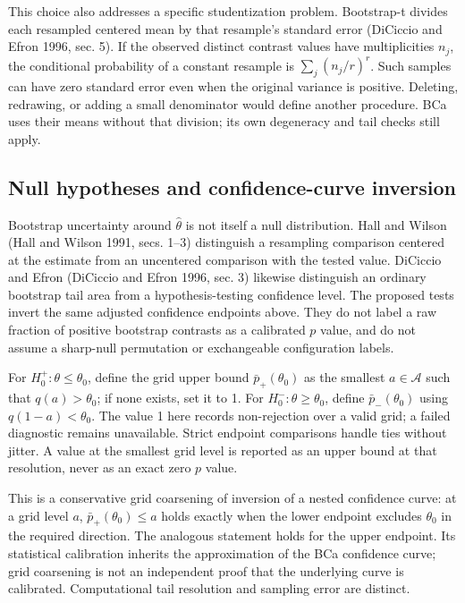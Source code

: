 \documentclass[
  english,
  11pt,
]{article}
\newcounter{none} %
\begin{document}
This choice also addresses a specific studentization problem.
Bootstrap-t divides each resampled centered mean by that resample's
standard error (DiCiccio and Efron 1996, sec. 5). If the observed
distinct contrast values have multiplicities \(n_j\), the conditional
probability of a constant resample is \(\sum_j(n_j/r)^r\). Such samples
can have zero standard error even when the original variance is
positive. Deleting, redrawing, or adding a small denominator would
define another procedure. BCa uses their means without that division;
its own degeneracy and tail checks still apply.

\subsection{Null hypotheses and confidence-curve
inversion}\label{null-hypotheses-and-confidence-curve-inversion}

Bootstrap uncertainty around \(\hat\theta\) is not itself a null
distribution. Hall and Wilson (Hall and Wilson 1991, secs. 1--3)
distinguish a resampling comparison centered at the estimate from an
uncentered comparison with the tested value. DiCiccio and Efron
(DiCiccio and Efron 1996, sec. 3) likewise distinguish an ordinary
bootstrap tail area from a hypothesis-testing confidence level. The
proposed tests invert the same adjusted confidence endpoints above. They
do not label a raw fraction of positive bootstrap contrasts as a
calibrated \(p\) value, and do not assume a sharp-null permutation or
exchangeable configuration labels.

For \(H^+_0:\theta\leq\theta_0\), define the grid upper bound
\(\bar p_+(\theta_0)\) as the smallest \(a\in\mathcal A\) such that
\(q(a)>\theta_0\); if none exists, set it to 1. For
\(H^-_0:\theta\geq\theta_0\), define \(\bar p_-(\theta_0)\) using
\(q(1-a)<\theta_0\). The value 1 here records non-rejection over a valid
grid; a failed diagnostic remains unavailable. Strict endpoint
comparisons handle ties without jitter. A value at the smallest grid
level is reported as an upper bound at that resolution, never as an
exact zero \(p\) value.

This is a conservative grid coarsening of inversion of a nested
confidence curve: at a grid level \(a\), \(\bar p_+(\theta_0)\leq a\)
holds exactly when the lower endpoint excludes \(\theta_0\) in the
required direction. The analogous statement holds for the upper
endpoint. Its statistical calibration inherits the approximation of the
BCa confidence curve; grid coarsening is not an independent proof that
the underlying curve is calibrated. Computational tail resolution and
sampling error are distinct.
\end{document}
